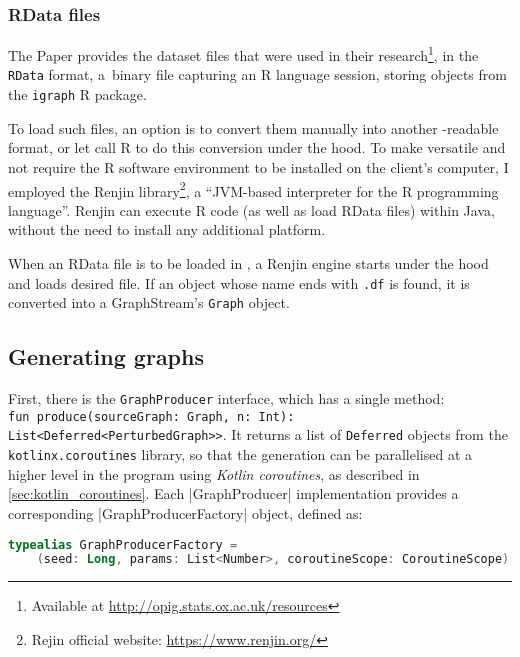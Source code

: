 \subsubsection*{RData files}\label{sec:rdata_files}

The Paper provides the dataset files that were used in their research\footnote{Available at \url{http://opig.stats.ox.ac.uk/resources}}, in the \texttt{RData} format, a~binary file capturing an R language session, storing objects from the \texttt{igraph} R package.

To load such files, an option is to convert them manually into another \graffs-readable format, or let \graffs call R to do this conversion under the hood.
To make \graffs versatile and not require the R software environment to be installed on the client's computer, I employed the Renjin library\footnote{Rejin official website: \url{https://www.renjin.org/}}, a \enquote{JVM-based interpreter for the R programming language}.
Renjin can execute R code (as well as load RData files) within Java, without the need to install any additional platform.

When an RData file is to be loaded in \graffs, a Renjin engine starts under the hood and loads desired file.
If an object whose name ends with \texttt{.df}\footnotemark{} is found, it is converted into a GraphStream's \texttt{Graph} object.

\subsection{Generating graphs}

First, there is the \texttt{GraphProducer} interface, which has a single method:\\ \texttt{fun produce(sourceGraph: Graph, n: Int): List<Deferred<PerturbedGraph>>}.
It returns a list of \texttt{Deferred} objects from the \texttt{kotlinx.coroutines} library, so that the generation can be parallelised at a higher level in the program using \textsl{Kotlin coroutines}, as described in \autoref{sec:kotlin_coroutines}.
Each |GraphProducer| implementation provides a corresponding |GraphProducerFactory| object, defined as:

\begin{lstlisting}[language=Kotlin]
typealias GraphProducerFactory =
    (seed: Long, params: List<Number>, coroutineScope: CoroutineScope) -> GraphProducer
\end{lstlisting}

